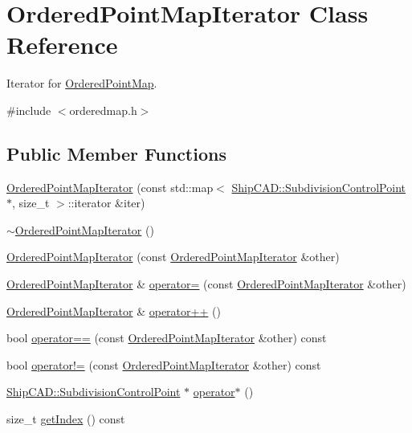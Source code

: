 \hypertarget{classOrderedPointMapIterator}{}\section{Ordered\+Point\+Map\+Iterator Class Reference}
\label{classOrderedPointMapIterator}


Iterator for \hyperlink{classOrderedPointMap}{Ordered\+Point\+Map}.  




{\ttfamily \#include $<$orderedmap.\+h$>$}

\subsection*{Public Member Functions}
\begin{DoxyCompactItemize}
\item 
\hyperlink{classOrderedPointMapIterator_acac924de32a36c7763d05f1fb197f77f}{Ordered\+Point\+Map\+Iterator} (const std\+::map$<$ \hyperlink{classShipCAD_1_1SubdivisionControlPoint}{Ship\+C\+A\+D\+::\+Subdivision\+Control\+Point} $\ast$, size\+\_\+t $>$\+::iterator \&iter)
\item 
\hyperlink{classOrderedPointMapIterator_a3bfaa63180e91597177dbd90c4463a9f}{$\sim$\+Ordered\+Point\+Map\+Iterator} ()
\item 
\hyperlink{classOrderedPointMapIterator_ad60424e1ca4bb814f69bb0b5c2c455e6}{Ordered\+Point\+Map\+Iterator} (const \hyperlink{classOrderedPointMapIterator}{Ordered\+Point\+Map\+Iterator} \&other)
\item 
\hyperlink{classOrderedPointMapIterator}{Ordered\+Point\+Map\+Iterator} \& \hyperlink{classOrderedPointMapIterator_a6c8d7a8455ad7c14117eb4ed15be341b}{operator=} (const \hyperlink{classOrderedPointMapIterator}{Ordered\+Point\+Map\+Iterator} \&other)
\item 
\hyperlink{classOrderedPointMapIterator}{Ordered\+Point\+Map\+Iterator} \& \hyperlink{classOrderedPointMapIterator_a4afb8fa2199d493a3f262e0cc0fbd9d5}{operator++} ()
\item 
bool \hyperlink{classOrderedPointMapIterator_a95913ce995a2778fb0a777ba1e4515f5}{operator==} (const \hyperlink{classOrderedPointMapIterator}{Ordered\+Point\+Map\+Iterator} \&other) const 
\item 
bool \hyperlink{classOrderedPointMapIterator_ab01092ab7421731c2207709849cc9269}{operator!=} (const \hyperlink{classOrderedPointMapIterator}{Ordered\+Point\+Map\+Iterator} \&other) const 
\item 
\hyperlink{classShipCAD_1_1SubdivisionControlPoint}{Ship\+C\+A\+D\+::\+Subdivision\+Control\+Point} $\ast$ \hyperlink{classOrderedPointMapIterator_a4b475c1342c415674fe9411f1debcb91}{operator$\ast$} ()
\item 
size\+\_\+t \hyperlink{classOrderedPointMapIterator_a86ab7660a91176915ce8a4237bdc4213}{get\+Index} () const 
\end{DoxyCompactItemize}


